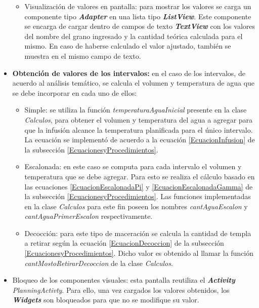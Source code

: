 \begin{itemize}
\begin{itemize}
                        \item Visualización de valores en pantalla: para mostrar los valores se carga un componente tipo \textbf{ \textit{\gls{Adapter}}} en una lista tipo \textbf{\textit{\gls{ListView}}}. Este componente se encarga de cargar dentro de campos de texto \textbf{\textit{\gls{TextView}}} con los valores del nombre del grano ingresado y la cantidad teórica calculada para el mismo. En caso de haberse calculado el valor ajustado, también se muestra en el mismo campo de texto.
                    \end{itemize}
                
                \item \textbf{Obtención de valores de los intervalos:}
                    en el caso de los intervalos, de acuerdo al análisis temático, se calcula el volumen y temperatura de agua que se debe incorporar en cada uno de ellos:
                    \begin{itemize}
                        \item Simple: se utiliza la función \textit{temperaturaAguaInicial} presente en la clase \textit{Calculos}, para obtener el volumen y temperatura del agua a agregar para que la infusión alcance la temperatura planificada para el único intervalo. La ecuación se implementó de acuerdo a la ecuación \ref{EcuacionInfusion} de la subsección \ref{EcuacionesyProcedimientos}.
                    
                        \item Escalonada: en este caso se computa para cada intervalo el volumen y temperatura que se debe agregar. Para esto se realiza el cálculo basado en las ecuaciones \ref{EcuacionEscalonadaPi} y \ref{EcuacionEscalonadaGamma} de la subsección \ref{EcuacionesyProcedimientos}. Las funciones implementadas en la clase \textit{Calculos} para este fin poseen los nombres \textit{cantAguaEscalon} y \textit{cantAguaPrimerEscalon} respectivamente.
                    
                        \item Decocción: para este tipo de maceración se calcula la cantidad de templa a retirar según la ecuación \ref{EcuacionDecoccion} de la subsección \ref{EcuacionesyProcedimientos}. Dicho valor es obtenido al llamar la función \textit{cantMostoRetirarDecoccion} de la clase \textit{Calculos}.
                    \end{itemize}
                    
                    \item Bloqueo de los componentes visuales: esta pantalla reutiliza el \textbf{\textit{Activity}} \textit{PlanningActivty}. Para ello, una vez cargados los valores obtenidos, los \textbf{\textit{\gls{Widget}s}} son bloqueados para que no se modifique su valor.

            \end{itemize}
            
